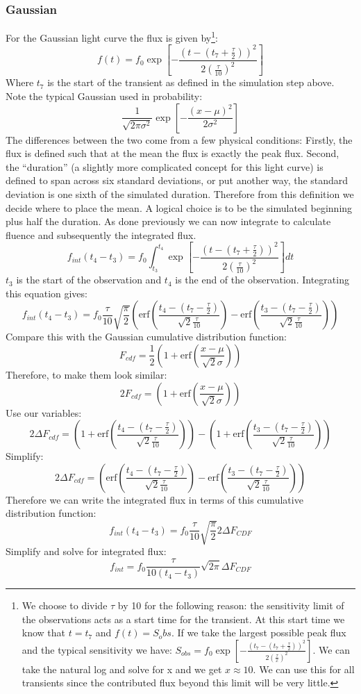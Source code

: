 \documentclass{article}
\begin{document}
\subsubsection{Gaussian}
For the Gaussian light curve the flux is given by\footnote{We choose to divide $\tau$ by 10 for the following reason: the sensitivity limit of the observations acts as a start time for the transient. At this start time we know that $t=t_7$ and $f(t)=S_obs$. If we take the largest possible peak flux and the typical sensitivity we have: $S_{obs} = f_0  \exp[-\frac{(t_7-(t_7+\frac{\tau}{2}))^2}{2(\frac{\tau}{x})^2}]$. We can take the natural log and solve for x and we get $x\approx 10$. We can use this for all transients since the contributed flux beyond this limit will be very little.}:
\[f(t) = f_0  \exp[-\frac{(t-(t_7+\frac{\tau}{2}))^2}{2(\frac{\tau}{10})^2}]\]
Where $t_7$ is the start of the transient as defined in the simulation step above. Note the typical Gaussian used in probability:
\[ \frac{1}{\sqrt{2\pi\sigma^2}}\exp[-\frac{(x-\mu)^2}{2\sigma^2}]\]
The differences between the two come from a few physical conditions: Firstly, the flux is defined such that at the mean the flux is exactly the peak flux. Second, the ``duration'' (a slightly more complicated concept for this light curve) is defined to span across six standard deviations, or put another way, the standard deviation is one sixth of the simulated duration. Therefore from this definition we decide where to place the mean. A logical choice is to be the simulated beginning plus half the duration. As done previously we can now integrate to calculate fluence and subsequently the integrated flux. 
\[f_{int}(t_4-t_3) = f_0 \int_{t_3}^{t_4} \exp[-\frac{(t-(t_7+\frac{\tau}{2}))^2}{2(\frac{\tau}{10})^2}]dt\]
$t_3$ is the start of the observation and $t_4$ is the end of the observation. Integrating this equation gives:
\[f_{int}(t_4-t_3) = f_0 \frac{\tau}{10}\sqrt{\frac{\pi}{2}}(\text{erf}(\frac{t_4-(t_7-\frac{\tau}{2})}{\sqrt{2}\frac{\tau}{10}})-\text{erf}(\frac{t_3-(t_7-\frac{\tau}{2})}{\sqrt{2}\frac{\tau}{10}}))\]
Compare this with the Gaussian cumulative distribution function:
\[F_{cdf}=\frac{1}{2}(1+\text{erf}(\frac{x-\mu}{\sqrt{2}\sigma}))\]
Therefore, to make them look similar:
\[2F_{cdf}=(1+\text{erf}(\frac{x-\mu}{\sqrt{2}\sigma}))\]
Use our variables:
\[2\Delta F_{cdf}=(1+\text{erf}(\frac{t_4-(t_7-\frac{\tau}{2})}{\sqrt{2}\frac{\tau}{10}}))-(1+\text{erf}(\frac{t_3-(t_7-\frac{\tau}{2})}{\sqrt{2}\frac{\tau}{10}}))\]
Simplify:
\[2\Delta F_{cdf}=(\text{erf}(\frac{t_4-(t_7-\frac{\tau}{2})}{\sqrt{2}\frac{\tau}{10}}) - \text{erf}(\frac{t_3-(t_7-\frac{\tau}{2})}{\sqrt{2}\frac{\tau}{10}}))\]
Therefore we can write the integrated flux in terms of this cumulative distribution function:
\[f_{int}(t_4-t_3) = f_0 \frac{\tau}{10}\sqrt{\frac{\pi}{2}}2\Delta F_{CDF}\]
Simplify and solve for integrated flux:
\[f_{int} = f_0 \frac{\tau}{10(t_4-t_3)}\sqrt{2\pi}\Delta F_{CDF}\]
\end{document}

